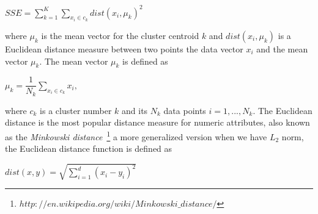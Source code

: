 \begin{center}
$SSE =\displaystyle \sum_{k=1}^{K}\displaystyle \sum_{x_i \in c_k}dist(x_i,\mu_k)^2$ 
\end{center}

where $\mu_k$ is the mean vector for the cluster centroid $k$ and $dist(x_i,\mu_k)$ is a Euclidean distance measure between two points the data vector $x_i$ and the mean vector $\mu_k$. The mean vector $\mu_k$ is defined as

\begin{center}
$\mu_k = \dfrac{1}{N_k}\displaystyle \sum_{x_i \in c_k}x_i,$ 
\end{center}

where $c_k$ is a cluster number $k$ and its $N_k$ data points $i=1,...,N_k$. The Euclidean distance is the most popular distance measure for numeric attributes, also known as the \textit{Minkowski distance}~\footnote{$http://en.wikipedia.org/wiki/Minkowski\_distance/$} a more generalized version when we have $L_2$ norm, the Euclidean distance function is defined as

\begin{center}
$dist(x,y) = \sqrt{\displaystyle \sum_{i=1}^{d}(x_i-y_i)^2} $
\end{center}

